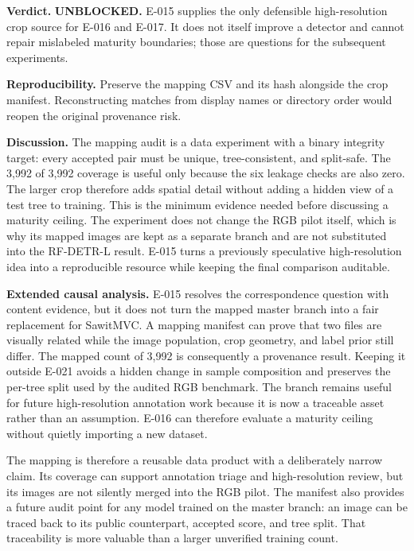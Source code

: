 \documentclass[preprint,12pt]{elsarticle}
\begin{document}
\textbf{Verdict.} \textbf{UNBLOCKED.} E-015 supplies the only defensible
high-resolution crop source for E-016 and E-017. It does not itself improve a
detector and cannot repair mislabeled maturity boundaries; those are questions
for the subsequent experiments.

\textbf{Reproducibility.} Preserve the mapping CSV and its hash alongside the
crop manifest. Reconstructing matches from display names or directory order
would reopen the original provenance risk.

\textbf{Discussion.} The mapping audit is a data experiment with a binary
integrity target: every accepted pair must be unique, tree-consistent, and
split-safe. The 3,992 of 3,992 coverage is useful only because the six
leakage checks are also zero. The larger crop therefore adds spatial detail
without adding a hidden view of a test tree to training. This is the minimum
evidence needed before discussing a maturity ceiling. The experiment does
not change the RGB pilot itself, which is why its mapped images are kept as a
separate branch and are not substituted into the RF-DETR-L result. E-015
turns a previously speculative high-resolution idea into a reproducible
resource while keeping the final comparison auditable.

\textbf{Extended causal analysis.} E-015 resolves the correspondence
question with content evidence, but it does not turn the mapped master branch
into a fair replacement for SawitMVC. A mapping manifest can prove that two
files are visually related while the image population, crop geometry, and
label prior still differ. The mapped count of 3,992 is consequently a
provenance result. Keeping it outside E-021 avoids a hidden change in sample
composition and preserves the per-tree split used by the audited RGB benchmark.
The branch remains useful for future high-resolution annotation work because
it is now a traceable asset rather than an assumption. E-016 can therefore
evaluate a maturity ceiling without quietly importing a new dataset.

The mapping is therefore a reusable data product with a deliberately narrow
claim. Its coverage can support annotation triage and high-resolution review,
but its images are not silently merged into the RGB pilot. The manifest also
provides a future audit point for any model trained on the master branch: an
image can be traced back to its public counterpart, accepted score, and tree
split. That traceability is more valuable than a larger unverified training
count.
\end{document}

